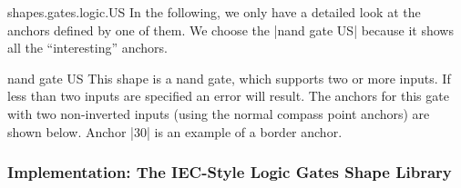 \begin{pgflibrary}{shapes.gates.logic.US}
  In the following, we only have a detailed look at the anchors
  defined by one of them. We choose the |nand gate US| because it
  shows all the ``interesting'' anchors.

  \begin{shape}{nand gate US}
    This shape is a nand gate, which supports two or more inputs. If
    less than two inputs are specified an error will result.
    The anchors for this gate with two
    non-inverted inputs (using the normal compass point anchors) are
    shown below. Anchor |30| is an example of a border anchor.

\begin{codeexample}[]
\Huge
{}
\end{codeexample}
  \end{shape}
\end{pgflibrary}



\subsubsection{Implementation: The IEC-Style Logic Gates Shape Library}

